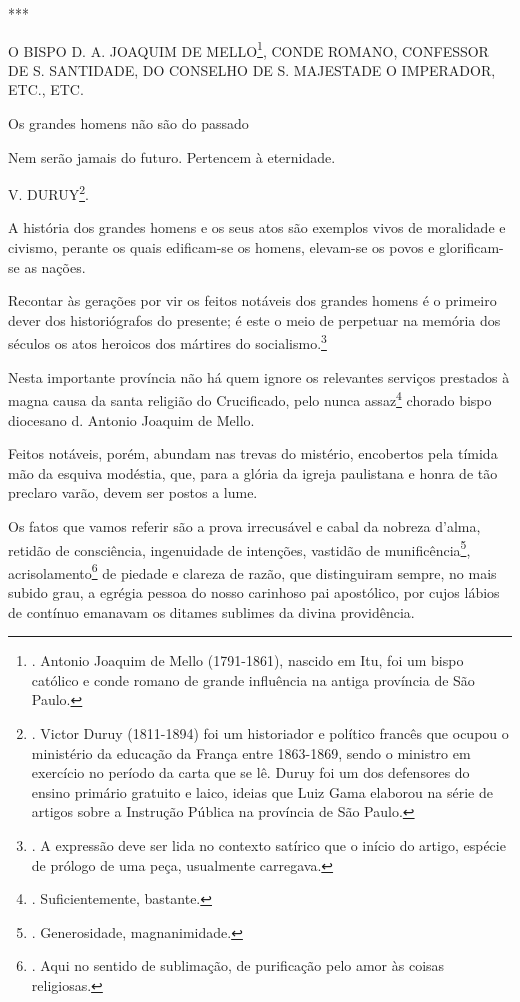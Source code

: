***

O BISPO D. A. JOAQUIM DE MELLO\footnote{. Antonio Joaquim de Mello
  (1791-1861), nascido em Itu, foi um bispo católico e conde romano de
  grande influência na antiga província de São Paulo.}, CONDE ROMANO,
CONFESSOR DE S. SANTIDADE, DO CONSELHO DE S. MAJESTADE O IMPERADOR,
ETC., ETC.

Os grandes homens não são do passado

Nem serão jamais do futuro. Pertencem à eternidade.

V. DURUY\footnote{. Victor Duruy (1811-1894) foi um historiador e
  político francês que ocupou o ministério da educação da França entre
  1863-1869, sendo o ministro em exercício no período da carta que se
  lê. Duruy foi um dos defensores do ensino primário gratuito e laico,
  ideias que Luiz Gama elaborou na série de artigos sobre a Instrução
  Pública na província de São Paulo.}.

A história dos grandes homens e os seus atos são exemplos vivos de
moralidade e civismo, perante os quais edificam-se os homens, elevam-se
os povos e glorificam-se as nações.

Recontar às gerações por vir os feitos notáveis dos grandes homens é o
primeiro dever dos historiógrafos do presente; é este o meio de
perpetuar na memória dos séculos os atos heroicos dos mártires do
socialismo.\footnote{. A expressão deve ser lida no contexto satírico
  que o início do artigo, espécie de prólogo de uma peça, usualmente
  carregava.}

Nesta importante província não há quem ignore os relevantes serviços
prestados à magna causa da santa religião do Crucificado, pelo nunca
assaz\footnote{. Suficientemente, bastante.} chorado bispo diocesano d.
Antonio Joaquim de Mello.

Feitos notáveis, porém, abundam nas trevas do mistério, encobertos pela
tímida mão da esquiva modéstia, que, para a glória da igreja paulistana
e honra de tão preclaro varão, devem ser postos a lume.

Os fatos que vamos referir são a prova irrecusável e cabal da nobreza
d'alma, retidão de consciência, ingenuidade de intenções, vastidão de
munificência\footnote{. Generosidade, magnanimidade.},
acrisolamento\footnote{. Aqui no sentido de sublimação, de purificação
  pelo amor às coisas religiosas.} de piedade e clareza de razão, que
distinguiram sempre, no mais subido grau, a egrégia pessoa do nosso
carinhoso pai apostólico, por cujos lábios de contínuo emanavam os
ditames sublimes da divina providência.

